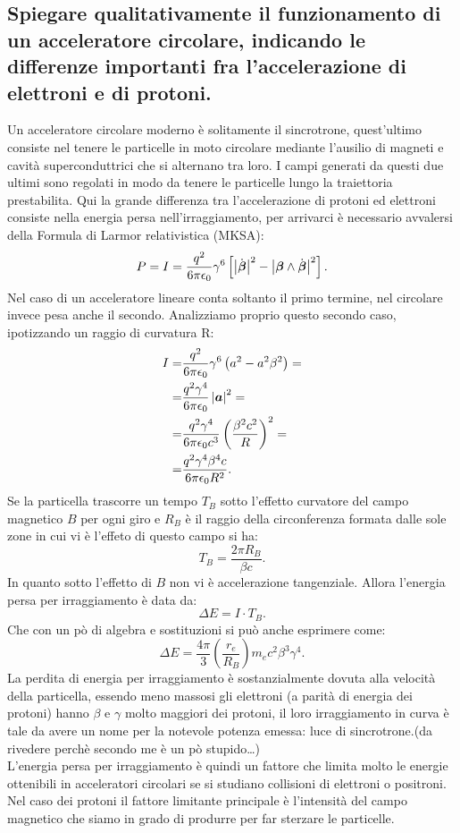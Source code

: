 \subsection[]{Spiegare qualitativamente il funzionamento di un acceleratore circolare, indicando le differenze importanti fra l’accelerazione di elettroni e di protoni.}
\label{sec:3.a.21}
Un acceleratore circolare moderno è solitamente il sincrotrone, quest'ultimo consiste nel tenere le particelle in moto circolare mediante l'ausilio di magneti e cavità superconduttrici che si alternano tra loro. I campi generati da questi due ultimi sono regolati in modo da tenere le particelle lungo la traiettoria prestabilita.
Qui la grande differenza tra l'accelerazione di protoni ed elettroni consiste nella energia persa nell'irraggiamento, per arrivarci è necessario avvalersi della Formula di Larmor relativistica (MKSA):
\[
	P=I= \frac{q^2}{6\pi \epsilon_0} \gamma^6\left[ \left| \dot{\boldsymbol{\beta}} \right|^2-\left| \boldsymbol{\beta}\wedge \dot{\boldsymbol{\beta}}  \right| ^2  \right] 
.\] \label{eq:Larmor}
Nel caso di un acceleratore lineare conta soltanto il primo termine, nel circolare invece pesa anche il secondo. Analizziamo proprio questo secondo caso, ipotizzando un raggio di curvatura R:
\begin{align*}
	I= &\frac{q^2}{6\pi \epsilon_0} \gamma^6 \left( a^2-a^2\beta^2  \right)=\\
	=&\frac{q^2\gamma^4}{6\pi \epsilon_0}\left| \boldsymbol{a} \right|^2 =\\
	=& \frac{q^2\gamma^4}{6\pi \epsilon_0c^3}\left( \frac{\beta^2c^2}{R} \right) ^2=\\
	=&\frac{q^2\gamma^4\beta^4c}{6\pi \epsilon_0R^2}
.\end{align*}
Se la particella trascorre un tempo $T_B$ sotto l'effetto curvatore del campo magnetico $B$ per ogni giro e $R_B$ è il raggio della circonferenza formata dalle sole zone in cui vi è l'effeto di questo campo si ha:
\[
	T_B = \frac{2\pi R_B}{\beta c}
.\] 
In quanto sotto l'effetto di $B$ non vi è accelerazione tangenziale. Allora l'energia persa per irraggiamento è data da:
\[
	\Delta E = I\cdot T_B
.\] 
Che con un pò di algebra e sostituzioni si può anche esprimere come:
\[
	\Delta E = \frac{4\pi}{3}\left( \frac{r_e}{R_B} \right) m_ec^2\beta^3\gamma^4  	
.\] 
La perdita di energia per irraggiamento è sostanzialmente dovuta alla velocità della particella, essendo meno massosi gli elettroni (a parità di energia dei protoni) hanno $\beta$ e $\gamma$ molto maggiori dei protoni, il loro irraggiamento in curva è tale da avere un nome per la notevole potenza emessa: luce di sincrotrone.(da rivedere perchè secondo me è un pò stupido\ldots)\\
L'energia persa per irraggiamento è quindi un fattore che limita molto le energie ottenibili in acceleratori circolari se si studiano collisioni di elettroni o positroni. Nel caso dei protoni il fattore limitante principale è l'intensità del campo magnetico che siamo in grado di produrre per far sterzare le particelle.


